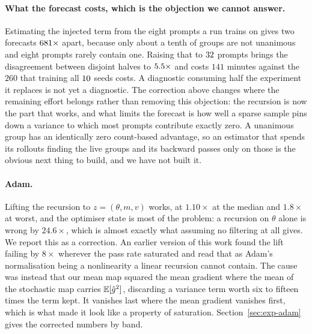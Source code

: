 \paragraph{What the forecast costs, which is the objection we cannot answer.} Estimating the
injected term from the eight prompts a run trains on gives two forecasts $681\times$ apart, because
only about a tenth of groups are not unanimous and eight prompts rarely contain one. Raising that
to $32$ prompts brings the disagreement between disjoint halves to
$5.5\times$ and costs $141$ minutes against the $260$ that training all
$10$ seeds costs. A diagnostic consuming half the experiment it replaces is not yet
a diagnostic. The correction above changes where the remaining effort belongs rather than removing
this objection: the recursion is now the part that works, and what limits the forecast is how well
a sparse sample pins down a variance to which most prompts contribute exactly zero. A unanimous
group has an identically zero count-based advantage, so an estimator that spends its rollouts
finding the live groups and its backward passes only on those is the obvious next thing to build,
and we have not built it.

\paragraph{Adam.} Lifting the recursion to $z = (\theta, m, v)$ works, at $1.10\times$ at the
median and $1.8\times$ at worst, and the optimiser state is most of the problem: a recursion on
$\theta$ alone is wrong by $24.6\times$, which is almost exactly what assuming no filtering at all
gives. We report this as a correction. An earlier version of this work found the lift failing by
$8\times$ wherever the pass rate saturated and read that as Adam's normalisation being a
nonlinearity a linear recursion cannot contain. The cause was instead that our mean map squared the
mean gradient where the mean of the stochastic map carries $\mathbb{E}[\hat{g}^2]$, discarding a variance
term worth six to fifteen times the term kept. It vanishes last where the mean gradient vanishes
first, which is what made it look like a property of saturation.
Section~\ref{sec:exp-adam} gives the corrected numbers by band.

